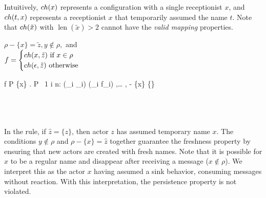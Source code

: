 Intuitively,
$ch(x)$ represents a configuration with a single receptionist $x$, and
$ch(t,x)$ represents a receptionist $x$ that temporarily assumed the name $t$.
Note that $ch(\tilde{x})$ with $\operatorname{len}(\tilde{x}) > 2$
cannot have the \emph{valid mapping} properties.
\\

\begin{minipage}{0.9\textwidth}
    {\judgement{}{}{\anullproc}}
    {}
    {\begin{varwidth}{6cm}
      $ \rho - \{x\} = \tilde{z}, y \notin \rho,$ and \\
      $ f =
        \begin{cases}
          ch(x, \tilde{z}) \text{ if } x \in \rho \\
          ch(\epsilon, \tilde{z}) \text{ otherwise }
        \end{cases} $
     \end{varwidth}}
    {\judgement
      {\rho}
      {f}
      {P}}
    {\judgement
      {\{x\} \cup {}}
      {}
      { . P}}
    {\forall\ 1 \leq i \leq n:
      }
    {\judgement
      {(\cup_i \rho_i)}
      {(\oplus_i f_i)}
      {
        {
        ,\ldots
        ,}}}
    {}
    {}
    {}
    {}
    {\judgement
      {\rho - \{x\}}
      {}
      {}}
    {\judgement
      {\{\}}
      {}
      {}}
\end{minipage}
\\
\\
\\
In the  rule,
if $\hat{z} = \{z\}$, then actor $z$ has assumed temporary name $x$.
The conditions $y \notin \rho$ and $\rho - \{x\} = \hat{z}$
together guarantee the freshness property by ensuring that new actors
are created with fresh names.
Note that it is possible for $x$ to be a regular name
and disappear after receiving a message ($x \notin \rho$).
We interpret this as the actor $x$ having assumed a sink behavior,
consuming messages without reaction.
With this interpretation, the persistence property is not violated.

